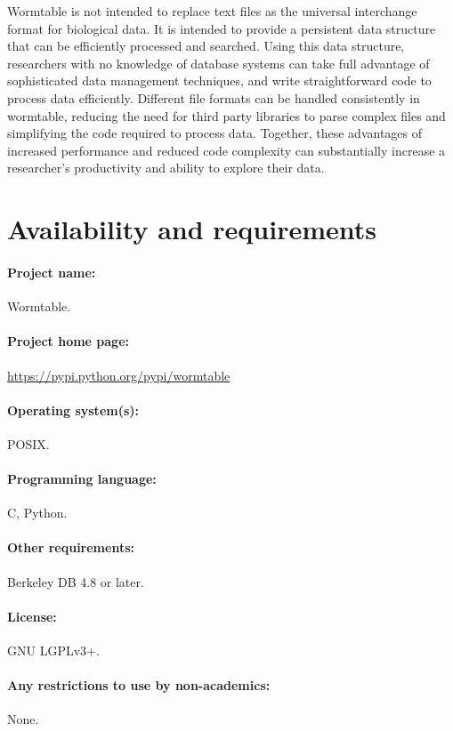 \documentclass[10pt]{bmc_article}
\newenvironment{bmcformat}{\begin{raggedright}\baselineskip20pt\sloppy\setboolean{publ}{false}}{\end{raggedright}\baselineskip20pt\sloppy}
\begin{document}
\begin{bmcformat}
Wormtable is not intended to replace text files as the universal 
interchange format for biological data. 
It is intended to provide a persistent data structure 
that can be efficiently processed 
and searched. Using this data structure, researchers with no knowledge of 
database systems can take full advantage of sophisticated 
data management techniques, and write straightforward code to process 
data efficiently. 
Different file formats can be handled consistently 
in wormtable, reducing the need for third party libraries 
to parse complex files and simplifying the code required 
to process data.
Together, these advantages of increased performance and reduced 
code complexity can substantially increase a researcher's 
productivity and ability to explore their data.


  
\section*{Availability and requirements}
\paragraph{Project name:} Wormtable.
\paragraph{Project home page:}\url{https://pypi.python.org/pypi/wormtable}
\paragraph{Operating system(s):} POSIX.
\paragraph{Programming language:} C, Python.
\paragraph{Other requirements:} Berkeley DB 4.8 or later.
\paragraph{License:} GNU LGPLv3+.
\paragraph{Any restrictions to use by non-academics:} None.

    

\end{bmcformat}
\end{document}
